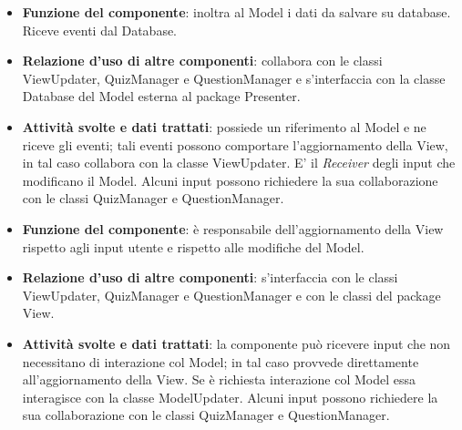\documentclass[a4paper,11pt]{article}
\begin{document}
			\begin{itemize}
				\item\textbf{Funzione del componente}: inoltra al Model i dati da salvare su database. Riceve eventi dal Database.
				\item\textbf{Relazione d'uso di altre componenti}: collabora con le classi ViewUpdater, QuizManager e QuestionManager e s'interfaccia con la classe Database del Model esterna al package Presenter.
				\item\textbf{Attività svolte e dati trattati}: possiede un riferimento al Model e ne riceve gli eventi; tali eventi possono comportare l'aggiornamento della View, in tal caso collabora con la classe ViewUpdater. E' il \emph{Receiver} degli input che modificano il Model. Alcuni input possono richiedere la sua collaborazione con le classi QuizManager e QuestionManager.
			\end{itemize}

			\begin{itemize}
				\item\textbf{Funzione del componente}: è responsabile dell'aggiornamento della View rispetto agli input utente e rispetto alle modifiche del Model.
				\item\textbf{Relazione d'uso di altre componenti}: s'interfaccia con le classi ViewUpdater, QuizManager e QuestionManager e con le classi del package View.
				\item\textbf{Attività svolte e dati trattati}: la componente può ricevere input che non necessitano di interazione col Model; in tal caso provvede direttamente all'aggiornamento della View. Se è richiesta interazione col Model essa interagisce con la classe ModelUpdater. Alcuni input possono richiedere la sua collaborazione con le classi QuizManager e QuestionManager.
			\end{itemize}
			\newpage
			
\end{document}
